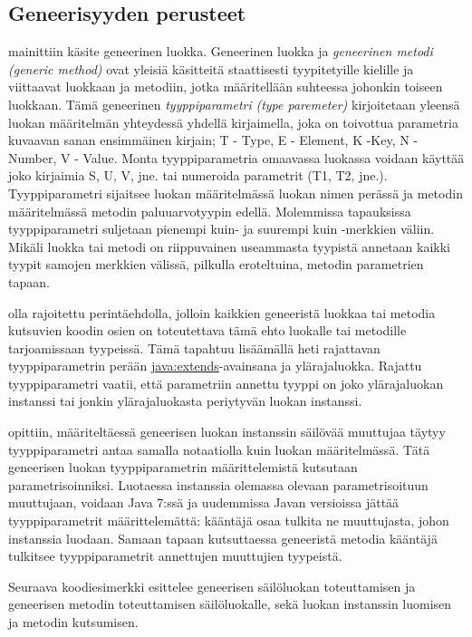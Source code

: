 \documentclass{tufte-book}
\newcommand{\eng}[1]{\textit{(#1)}}
\newcommand{\new}[1]{\textit{\gls{#1}}}
\newcommand{\neweng}[2]{\new{#1} \eng{#2}}
\newcommand{\java}[1]{\underline{\gls{java:#1}}}
\begin{document}
\subsection{Geneerisyyden perusteet}
\label{genericBasics}

  mainittiin käsite \gls{geneerinen luokka}. 
Geneerinen luokka ja \neweng{geneerinen metodi}{generic method} ovat yleisiä käsitteitä
staattisesti tyypitetyille kielille ja viittaavat luokkaan ja metodiin, jotka määritellään
suhteessa johonkin toiseen luokkaan. Tämä geneerinen \neweng{tyyppiparametri}{type paremeter}
kirjoitetaan yleensä luokan määritelmän yhteydessä yhdellä kirjaimella, joka on toivottua
parametria kuvaavan sanan ensimmäinen kirjain; T - Type, E - Element, K -Key, N - Number, V -
Value. Monta tyyppiparametria omaavassa luokassa voidaan käyttää joko kirjaimia S, U, V, jne. tai
numeroida parametrit (T1, T2, jne.). Tyyppiparametri sijaitsee luokan määritelmässä luokan nimen
perässä ja metodin määritelmässä metodin paluuarvotyypin edellä. Molemmissa tapauksissa
tyyppiparametri suljetaan pienempi kuin- ja suurempi kuin -merkkien väliin. Mikäli luokka tai
metodi on riippuvainen useammasta tyypistä annetaan kaikki tyypit samojen merkkien välissä,
pilkulla eroteltuina, metodin parametrien tapaan. 

 olla rajoitettu perintäehdolla, jolloin kaikkien
geneeristä luokkaa tai metodia kutsuvien koodin osien on toteutettava tämä ehto luokalle tai
metodille tarjoamissaan tyypeissä. Tämä tapahtuu lisäämällä heti rajattavan tyyppiparametrin
perään \java{extends}-avainsana ja ylärajaluokka. Rajattu tyyppiparametri vaatii, että parametriin
annettu tyyppi on joko ylärajaluokan instanssi tai jonkin ylärajaluokasta periytyvän luokan
instanssi.

  opittiin, määriteltäessä geneerisen luokan
instanssin säilövää muuttujaa täytyy tyyppiparametri antaa samalla notaatiolla kuin luokan
määritelmässä. Tätä geneerisen luokan tyyppiparametrin määrittelemistä kutsutaan
parametrisoinniksi. Luotaessa instanssia olemassa olevaan parametrisoituun muuttujaan, voidaan
Java 7:ssä ja uudemmissa Javan versioissa jättää tyyppiparametrit määrittelemättä: kääntäjä osaa
tulkita ne muuttujasta, johon instanssia luodaan. Samaan tapaan kutsuttaessa geneeristä metodia
kääntäjä tulkitsee tyyppiparametrit annettujen muuttujien tyypeistä.

Seuraava koodiesimerkki esittelee
geneerisen säilöluokan toteuttamisen ja geneerisen metodin toteuttamisen säilöluokalle, sekä
luokan instanssin luomisen ja metodin kutsumisen.
\end{document}
